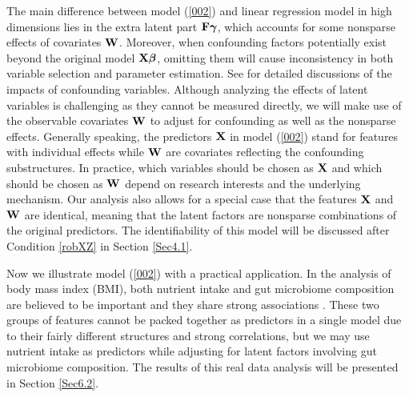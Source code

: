 \documentclass{statsoc}
\newcommand{\bF}{\mbox{\bf F}}
\newcommand{\bW}{\mbox{\bf W}}
\newcommand{\bX}{\mbox{\bf X}}
\newcommand{\bbeta}{\mbox{\boldmath $\beta$}}
\newcommand{\bgamma}{\mbox{\boldmath $\gamma$}}
\begin{document}
The main difference between model (\ref{002}) and linear regression model in high dimensions lies in the extra latent part $\bF \bgamma$, which accounts for some nonsparse effects of covariates $\bW$. Moreover, when confounding factors potentially exist beyond the original model $\bX \bbeta$, omitting them will cause inconsistency in both variable selection and parameter estimation. See \cite[Chapter 2]{Anderson1980} for detailed discussions of the impacts of confounding variables. Although analyzing the effects of latent variables is challenging as they cannot be measured directly, we will make use of the observable covariates $\bW$ to adjust for confounding as well as the nonsparse effects. Generally speaking, the predictors $\bX$ in model (\ref{002}) stand for features with individual effects while $\bW$ are covariates reflecting the confounding substructures. In practice, which variables should be chosen as $\bX$ and which should be chosen as $\bW$ depend on research interests and the underlying mechanism. Our analysis also allows for a special case that the features $\bX$ and $\bW$ are identical, meaning that the latent factors are nonsparse combinations of the original predictors. The identifiability of this model will be discussed after Condition \ref{robXZ} in Section \ref{Sec4.1}.





Now we illustrate model (\ref{002}) with a practical application. In the analysis of body mass index (BMI), both nutrient intake and gut microbiome composition are believed to be important and they share strong associations \citep{ChenLi2013}. These two groups of features cannot be packed together as predictors in a single model due to their fairly different structures and strong correlations, but we may use nutrient intake as predictors while adjusting for latent factors involving gut microbiome composition. The results of this real data analysis will be presented in Section \ref{Sec6.2}.
\end{document}

